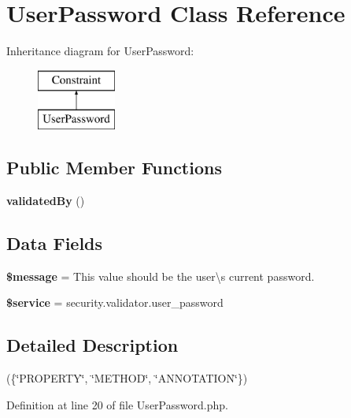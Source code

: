 \section{User\+Password Class Reference}
\label{class_symfony_1_1_component_1_1_security_1_1_core_1_1_validator_1_1_constraints_1_1_user_password}
Inheritance diagram for User\+Password\+:\begin{figure}[H]
\begin{center}
\leavevmode
\includegraphics[height=2.000000cm]{class_symfony_1_1_component_1_1_security_1_1_core_1_1_validator_1_1_constraints_1_1_user_password}
\end{center}
\end{figure}
\subsection*{Public Member Functions}
\begin{DoxyCompactItemize}
\item 
{\bf validated\+By} ()
\end{DoxyCompactItemize}
\subsection*{Data Fields}
\begin{DoxyCompactItemize}
\item 
{\bf \$message} = \textquotesingle{}This value should be the user\textbackslash{}\textquotesingle{}s current password.\textquotesingle{}
\item 
{\bf \$service} = \textquotesingle{}security.\+validator.\+user\+\_\+password\textquotesingle{}
\end{DoxyCompactItemize}


\subsection{Detailed Description}
(\{\char`\"{}\+P\+R\+O\+P\+E\+R\+T\+Y\char`\"{}, \char`\"{}\+M\+E\+T\+H\+O\+D\char`\"{}, \char`\"{}\+A\+N\+N\+O\+T\+A\+T\+I\+O\+N\char`\"{}\}) 

Definition at line 20 of file User\+Password.\+php.



